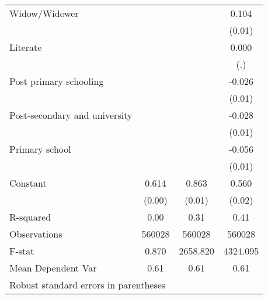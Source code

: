 {\begin{tabular}{l*{3}{c}}
Widow/Widower       &                     &                     &       0.104\sym{***}\\
                    &                     &                     &      (0.01)         \\
Literate            &                     &                     &       0.000         \\
                    &                     &                     &         (.)         \\
Post primary schooling&                     &                     &      -0.026\sym{**} \\
                    &                     &                     &      (0.01)         \\
Post-secondary and university&                     &                     &      -0.028\sym{*}  \\
                    &                     &                     &      (0.01)         \\
Primary school      &                     &                     &      -0.056\sym{***}\\
                    &                     &                     &      (0.01)         \\
Constant            &       0.614\sym{***}&       0.863\sym{***}&       0.560\sym{***}\\
                    &      (0.00)         &      (0.01)         &      (0.02)         \\
\hline
R-squared           &        0.00         &        0.31         &        0.41         \\
Observations        &      560028         &      560028         &      560028         \\
F-stat              &       0.870         &    2658.820         &    4324.095         \\
Mean Dependent Var  &        0.61         &        0.61         &        0.61         \\
\hline\hline
\multicolumn{4}{l}{\footnotesize Robust standard errors in parentheses}\\
\end{tabular}
}
